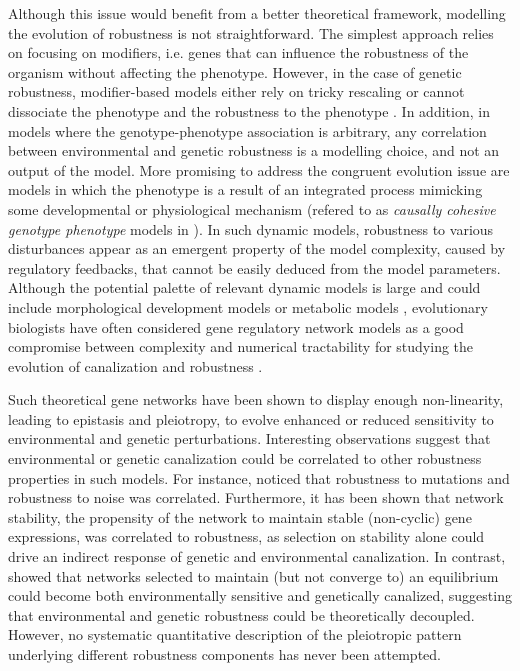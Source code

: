 \documentclass[10pt,a4paper]{article}
\begin{document}
Although this issue would benefit from a better theoretical framework, modelling the evolution of robustness is not straightforward. The simplest approach relies on focusing on modifiers, i.e. genes that can influence the robustness of the organism without affecting the phenotype. However, in the case of genetic robustness, modifier-based models either rely on tricky rescaling or cannot dissociate the phenotype and the robustness to the phenotype \citep{WBB97, Kaw00, RM13}. In addition, in models where the genotype-phenotype association is arbitrary, any correlation between environmental and genetic robustness is a modelling choice, and not an output of the model. More promising to address the congruent evolution issue are models in which the phenotype is a result of an integrated process mimicking some developmental or physiological mechanism (refered to as \emph{causally cohesive
genotype phenotype} models in \cite{RGV08}). In such dynamic models, robustness to various disturbances appear as an emergent property of the model complexity, caused by regulatory feedbacks, that cannot be easily deduced from the model parameters. Although the potential palette of relevant dynamic models is large and could include morphological development models \citep{MS20} or metabolic models \citep{NBR19}, evolutionary biologists have often considered gene regulatory network models as a good compromise between complexity and numerical tractability for studying the evolution of canalization and robustness \citep{Kau69,Wag94,SBB00,LP12}.

Such theoretical gene networks have been shown to display enough non-linearity, leading to epistasis and pleiotropy, to evolve enhanced or reduced sensitivity to environmental \citep{Mas04,EMW11,EMW11b} and genetic \citep{Wag96,BS03,DW08,ALS+06,RL16} perturbations. Interesting observations suggest that environmental or genetic canalization could be correlated to other robustness properties in such models. For instance, \citet{CMW07} noticed that robustness to mutations and robustness to noise was correlated. Furthermore, it has been shown that network stability, the propensity of the network to maintain stable (non-cyclic) gene expressions, was correlated to robustness, as selection on stability alone could drive an indirect response of genetic \citep{SB02} and environmental \citep{Mas04} canalization. In contrast, \citet{ORL18} showed that networks selected to maintain (but not converge to) an equilibrium could become both environmentally sensitive and genetically canalized, suggesting that environmental and genetic robustness could be theoretically decoupled. However, no systematic quantitative description of the pleiotropic pattern underlying different robustness components has never been attempted. 
\end{document}
